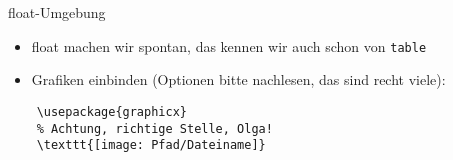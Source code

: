 \begin{frame}[fragile]{float-Umgebung}
    \begin{itemize}[<+->]
        \item float machen wir spontan, das kennen wir auch schon von \texttt{table}
        \item Grafiken einbinden (Optionen bitte nachlesen, das sind recht viele):
    \end{itemize}
    \begin{lstlisting}
    \usepackage{graphicx}
    % Achtung, richtige Stelle, Olga!
    \texttt{[image: Pfad/Dateiname]}
    \end{lstlisting}
\end{frame}

